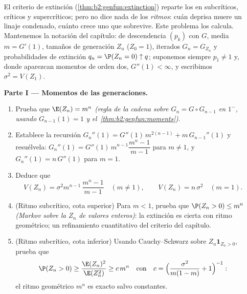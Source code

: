 \begin{problem}\label{pb:b2:genfun:1}
El criterio de extinción (\cref{thm:b2:genfun:extinction}) reparte
los  en
subcríticos, críticos y supercríticos; pero no dice nada de los
\emph{ritmos}: cuán deprisa muere un linaje condenado, cuánto crece
uno que sobrevive. Este problema los calcula. Mantenemos la notación
del capítulo:  de descendencia $(p_k)$ con 
$G$, media $m = G'(1)$, tamaños de generación $Z_n$ ($Z_0 = 1$),
iterados $G_n = G_{Z_n}$ y probabilidades de extinción $q_n = \P(Z_n
= 0) \uparrow q$; suponemos siempre $p_1 \neq 1$ y, donde aparezcan
momentos de orden dos, $G''(1) < \infty$, y escribimos $\sigma^2 =
V(Z_1)$.

\medskip
\noindent\textbf{Parte I --- Momentos de las generaciones.}
\begin{enumerate}
  \item Prueba que $\E(Z_n) = m^n$ \emph{(regla de la cadena sobre
        $G_n = G \circ G_{n-1}$ en $1^-$, usando $G_{n-1}(1) = 1$ y
        el~\cref{thm:b2:genfun:moments})}.
  \item Establece la recursión $G_n''(1) = G''(1)\,m^{2(n-1)} +
        m\,G_{n-1}''(1)$ y resuélvela: $G_n''(1) =
        G''(1)\,m^{n-1}\dfrac{m^n - 1}{m - 1}$ para $m \neq 1$, y
        $G_n''(1) = n\,G''(1)$ para $m = 1$.
  \item Deduce que
        \[
        V(Z_n) = \sigma^2m^{n-1}\,\frac{m^n - 1}{m - 1}
        \quad (m \neq 1),
        \qquad
        V(Z_n) = n\,\sigma^2 \quad (m = 1).
        \]
  \item (Ritmo subcrítico, cota superior) Para $m < 1$, prueba que
        $\P(Z_n > 0) \leq m^n$ \emph{(Markov sobre la $Z_n$ de
        valores enteros)}: la extinción es cierta con ritmo
        geométrico; un refinamiento cuantitativo del criterio del
        capítulo.
  \item (Ritmo subcrítico, cota inferior) Usando Cauchy--Schwarz
        sobre $Z_n\mathbf 1_{Z_n > 0}$, prueba que
        \[
        \P(Z_n > 0) \geq \frac{\E(Z_n)^2}{\E(Z_n^2)}
        \geq c\,m^{n}
        \quad\text{con}\quad
        c = \Bigl(\frac{\sigma^2}{m(1-m)} + 1\Bigr)^{-1} :
        \]
        el ritmo geométrico $m^n$ es exacto salvo constantes.
\end{enumerate}


\end{problem}
